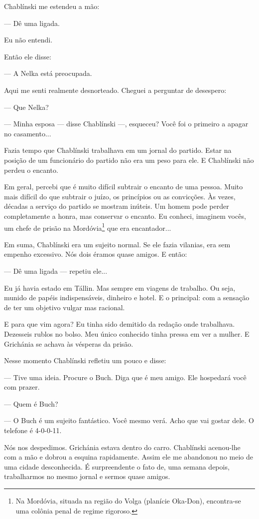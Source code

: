 Chablínski me estendeu a mão:

--- Dê uma ligada.

Eu não entendi.

Então ele disse:

--- A Nelka está preocupada.

Aqui me senti realmente desnorteado. Cheguei a perguntar de desespero:

--- Que Nelka?

--- Minha esposa --- disse Chablínski ---, esqueceu? Você foi o primeiro
a apagar no casamento...

Fazia tempo que Chablínski trabalhava em um jornal do partido. Estar na
posição de um funcionário do partido não era um peso para ele. E
Chablínski não perdeu o encanto.

Em geral, percebi que é muito difícil subtrair o encanto de uma pessoa.
Muito mais difícil do que subtrair o juízo, os princípios ou as
convicções. Às vezes, décadas a serviço do partido se mostram inúteis.
Um homem pode perder completamente a honra, mas conservar o encanto. Eu
conheci, imaginem vocês, um chefe de prisão na Mordóvia\footnote{Na
  Mordóvia, situada na região do Volga (planície Oka-Don), encontra-se
  uma colônia penal de regime rigoroso.} que era encantador...

Em suma, Chablínski era um sujeito normal. Se ele fazia vilanias, era
sem empenho excessivo. Nós dois éramos quase amigos. E então:

--- Dê uma ligada --- repetiu ele...

Eu já havia estado em Tállin. Mas sempre em viagens de trabalho. Ou
seja, munido de papéis indispensáveis, dinheiro e hotel. E o principal:
com a sensação de ter um objetivo vulgar mas racional.

E para que vim agora? Eu tinha sido demitido da redação onde trabalhava.
Dezesseis rublos no bolso. Meu único conhecido tinha pressa em ver a
mulher. E Grichánia se achava às vésperas da prisão.

Nesse momento Chablínski refletiu um pouco e disse:

--- Tive uma ideia. Procure o Buch. Diga que é meu amigo. Ele hospedará
você com prazer.

--- Quem é Buch?

--- O Buch é um sujeito fantástico. Você mesmo verá. Acho que vai gostar
dele. O telefone é 4-0-0-11.

Nós nos despedimos. Grichánia estava dentro do carro. Chablínski
acenou-lhe com a mão e dobrou a esquina rapidamente. Assim ele me
abandonou no meio de uma cidade desconhecida. É surpreendente o fato de,
uma semana depois, trabalharmos no mesmo jornal e sermos quase amigos.

